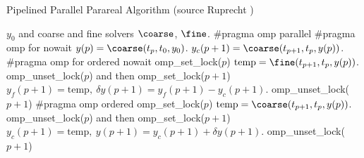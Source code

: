 \begin{breakablealgorithm}
  \caption{Pipelined Parallel Parareal Algorithm (source Ruprecht \cite{ruprecht})}
  \label{alg:pparareal}
  \begin{algorithmic}[1]
    \Require $y_0$ and coarse and fine solvers $\coarse$, $\fine$.
    \State \#pragma omp parallel
    \State \#pragma omp for nowait 
        \State $y(p) = \coarse(t_{p},t_0,y_0)$.
      \EndIf
      \State $y_c(p+1) = \coarse(t_{p+1},t_p, y(p))$.
    \EndFor
      \State \#pragma omp for ordered nowait
        \State omp\_set\_lock($p$) 
        \State $\textrm{temp} = \fine(t_{p+1},t_p,y(p))$.
        \State omp\_unset\_lock($p$) and then omp\_set\_lock($p+1$)
        \State $y_f(p+1) = \textrm{temp},\ \delta y(p+1) = y_f(p+1)-y_c(p+1)$.
        \State omp\_unset\_lock($p+1$)
        \State \#pragma omp ordered 
        \Indent
          \State omp\_set\_lock($p$) 
          \State $\textrm{temp} = \coarse(t_{p+1},t_p,y(p))$.
          \State omp\_unset\_lock($p$) and then omp\_set\_lock($p+1$)
          \State $y_c(p+1) = \textrm{temp},\ y(p+1) = y_c(p+1) + \delta y(p+1)$.
          \State omp\_unset\_lock($p+1$)
        \EndIndent
      \EndFor
    \EndWhile
  \end{algorithmic}
\end{breakablealgorithm}
